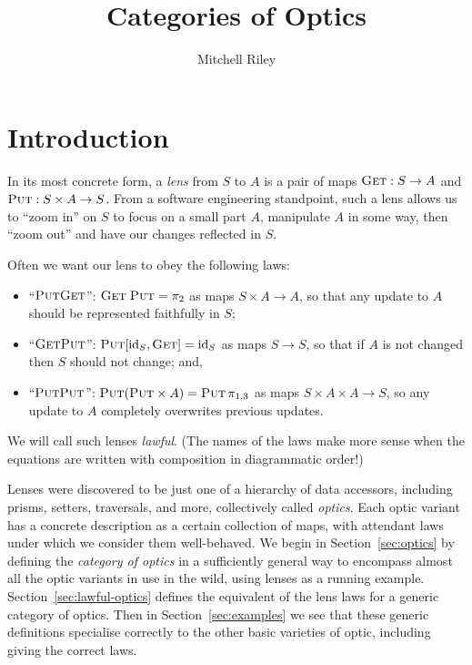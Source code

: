 \documentclass[11pt,letterpaper]{article}
\title{Categories of Optics}
\author{Mitchell Riley}
\affil{Wesleyan University \\ \texttt{mvriley@wesleyan.edu}}
\theoremstyle{plain}
\theoremstyle{definition}
\newcommand{\id}{\mathrm{id}}
\newcommand{\fget}{\textsc{Get}}
\newcommand{\fput}{\textsc{Put}}
\newcommand{\todo}[1]{\textcolor{red}{\small #1}}
\begin{document}
\maketitle

\section{Introduction}

In its most concrete form, a \emph{lens} from $S$ to $A$ is a pair of maps $\fget : S \to A$ and $\fput : S \times A \to S$. From a software engineering standpoint, such a lens allows us to ``zoom in'' on $S$ to focus on a small part $A$, manipulate $A$ in some way, then ``zoom out'' and have our changes reflected in $S$.

Often we want our lens to obey the following laws:
\begin{itemize}
\item ``$\fput\fget$'': $\fget \; \fput = \pi_2$ as maps $S \times A \to A$, so that any update to $A$ should be represented faithfully in $S$;
\item ``$\fget\fput$'': $\fput [\id_S, \fget] = \id_S$ as maps $S \to S$, so that if $A$ is not changed then $S$ should not change; and,
\item ``$\fput\fput$'': $\fput (\fput \times A) = \fput \, \pi_{1, 3}$ as maps $S \times A \times A \to S$, so any update to $A$ completely overwrites previous updates.
\end{itemize}
We will call such lenses \emph{lawful}. (The names of the laws make more sense when the equations are written with composition in diagrammatic order!)


Lenses were discovered to be just one of a hierarchy of data accessors, including prisms, setters, traversals, and more, collectively called \emph{optics}. Each optic variant has a concrete description as a certain collection of maps, with attendant laws under which we consider them well-behaved. We begin in Section~\ref{sec:optics} by defining the \emph{category of optics} in a sufficiently general way to encompass almost all the optic variants in use in the wild, using lenses as a running example. Section~\ref{sec:lawful-optics} defines the equivalent of the lens laws for a generic category of optics. Then in Section~\ref{sec:examples} we see that these generic definitions specialise correctly to the other basic varieties of optic, including giving the correct laws.
\end{document}
